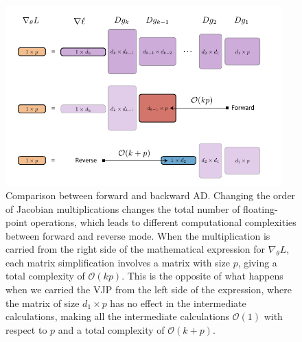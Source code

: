 \begin{figure}[t]
    \centering
    \includegraphics[width=0.95\textwidth]{figures/VJP-AD.pdf}
    \caption{Comparison between forward and backward AD. Changing the order of Jacobian multiplications changes the total number of floating-point operations, which leads to different computational complexities between forward and reverse mode. When the multiplication is carried from the right side of the mathematical expression for $\nabla_\theta L$, each matrix simplification involves a matrix with size $p$, giving a total complexity of $\mathcal O (kp)$. This is the opposite of what happens when we carried the VJP from the left side of the expression, where the matrix of size $d_1 \times p$ has no effect in the intermediate calculations, making all the intermediate calculations $\mathcal O (1)$ with respect to $p$ and a total complexity of $\mathcal O (k + p)$. }
    \label{fig:vjp-jvp}
\end{figure}


